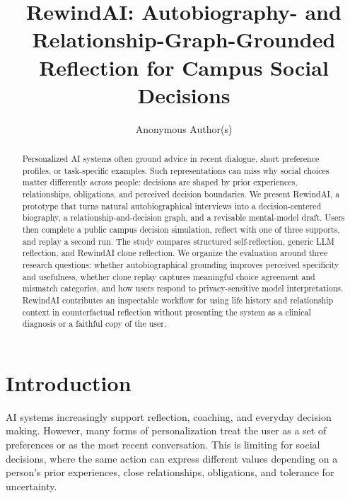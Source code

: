 \documentclass[sigconf,review,anonymous]{acmart}
\begin{document}
\title[RewindAI]{RewindAI: Autobiography- and Relationship-Graph-Grounded Reflection for Campus Social Decisions}

\author{Anonymous Author(s)}
\renewcommand{\shortauthors}{Anonymous Author(s)}

\begin{abstract}
Personalized AI systems often ground advice in recent dialogue, short preference profiles, or task-specific examples. Such representations can miss why social choices matter differently across people: decisions are shaped by prior experiences, relationships, obligations, and perceived decision boundaries. We present RewindAI, a prototype that turns natural autobiographical interviews into a decision-centered biography, a relationship-and-decision graph, and a revisable mental-model draft. Users then complete a public campus decision simulation, reflect with one of three supports, and replay a second run. The study compares structured self-reflection, generic LLM reflection, and RewindAI clone reflection. We organize the evaluation around three research questions: whether autobiographical grounding improves perceived specificity and usefulness, whether clone replay captures meaningful choice agreement and mismatch categories, and how users respond to privacy-sensitive model interpretations. RewindAI contributes an inspectable workflow for using life history and relationship context in counterfactual reflection without presenting the system as a clinical diagnosis or a faithful copy of the user.
\end{abstract}


\maketitle

\section{Introduction}

AI systems increasingly support reflection, coaching, and everyday decision making. However, many forms of personalization treat the user as a set of preferences or as the most recent conversation. This is limiting for social decisions, where the same action can express different values depending on a person's prior experiences, close relationships, obligations, and tolerance for uncertainty.
\end{document}
